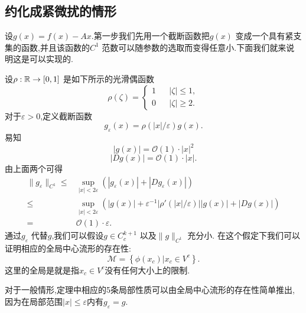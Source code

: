 \subsection{约化成紧微扰的情形}
设$g(x)=f(x)-Ax$.第一步我们先用一个截断函数把$g(x)$ 变成一个具有紧支集的函数,并且该函数的$C^{1}$ 范数可以随参数的选取而变得任意小.下面我们就来说明这是可以实现的.

设$\rho:\mathbb{R}\to [0,1]$ 是如下所示的光滑偶函数
\begin{equation}
  \rho(\zeta)=\left\{\begin{aligned}
      1 & &  \left| \zeta \right| \le 1,\\
      0 & &  \left| \zeta \right| \ge 2.
  \end{aligned}\right.
\end{equation}
对于$\varepsilon >0$,定义截断函数
\[
  g_{\varepsilon }(x)=\rho(\left| x \right| /\varepsilon )g(x).
\] 
易知
\[
  \left| g(x) \right| =\mathcal{O}(1)\cdot \left| x \right| ^{2}
\] 
\[
  \left| Dg(x) \right| =\mathcal{O}(1)\cdot \left| x \right| .
\] 
由上面两个可得
\begin{align*}
  \|g_\varepsilon \|_{C^{1}}\le & \sup_{\left| x \right| <2\varepsilon }\left( \left| g_\varepsilon (x) \right| +\left| Dg_\varepsilon (x) \right|  \right) \\
  \le  & \sup_{\left| x \right| <2\varepsilon }\left( \left| g(x) \right| +\varepsilon ^{-1}\left| \rho'(\left| x \right| /\varepsilon ) \right| \left| g(x) \right| +\left| Dg(x) \right|  \right) \\
  =& \mathcal{O}(1)\cdot \varepsilon 
.\end{align*}
通过$g_{\varepsilon }$ 代替$g$,我们可以假设$g\in C_c^{k+1}$ 以及$\|g\|_{C^{1}}$ 充分小. 在这个假定下我们可以证明相应的全局中心流形的存在性:
\begin{equation}
  \mathcal{M}=\left\{ \phi(x_c)\lvert x_c \in V^{c} \right\}. \label{31}
\end{equation}
这里的全局是就是指$x_c\in V^{c}$没有任何大小上的限制.

对于一般情形,定理中相应的5条局部性质可以由全局中心流形的存在性简单推出,因为在局部范围$\left| x \right| \le \varepsilon $内有$g_\varepsilon =g$.
